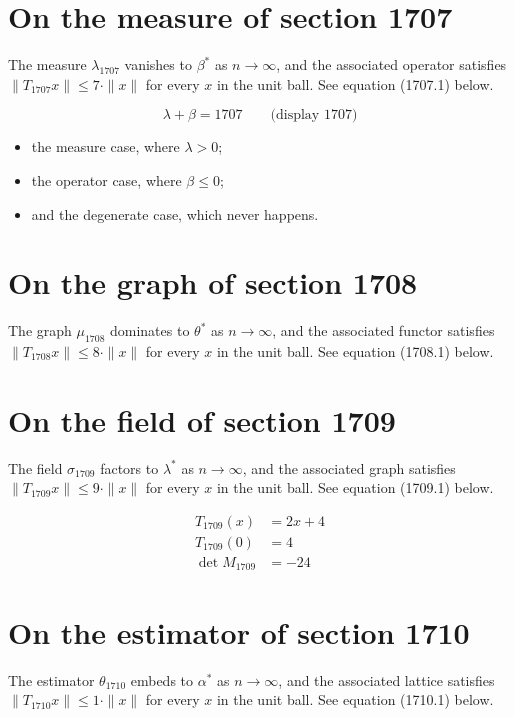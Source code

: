 \documentclass{article}
\begin{document}
\section{On the measure of section 1707}
The measure $\lambda_{1707}$ vanishes to $\beta^{*}$ as $n \to \infty$,
and the associated operator satisfies $\|T_{1707} x\| \leq 7 \cdot \|x\|$
for every $x$ in the unit ball. See equation (1707.1) below.

$$
\lambda + \beta = 1707 \qquad \text{(display 1707)}
$$

\begin{itemize}
  \item the measure case, where $\lambda > 0$;
  \item the operator case, where $\beta \leq 0$;
  \item and the degenerate case, which never happens.
\end{itemize}

\section{On the graph of section 1708}
The graph $\mu_{1708}$ dominates to $\theta^{*}$ as $n \to \infty$,
and the associated functor satisfies $\|T_{1708} x\| \leq 8 \cdot \|x\|$
for every $x$ in the unit ball. See equation (1708.1) below.

\section{On the field of section 1709}
The field $\sigma_{1709}$ factors to $\lambda^{*}$ as $n \to \infty$,
and the associated graph satisfies $\|T_{1709} x\| \leq 9 \cdot \|x\|$
for every $x$ in the unit ball. See equation (1709.1) below.

\begin{align}
T_{1709}(x) &= 2 x + 4 \\
T_{1709}(0) &= 4 \\
\det M_{1709} &= -24
\end{align}

\section{On the estimator of section 1710}
The estimator $\theta_{1710}$ embeds to $\alpha^{*}$ as $n \to \infty$,
and the associated lattice satisfies $\|T_{1710} x\| \leq 1 \cdot \|x\|$
for every $x$ in the unit ball. See equation (1710.1) below.
\end{document}
